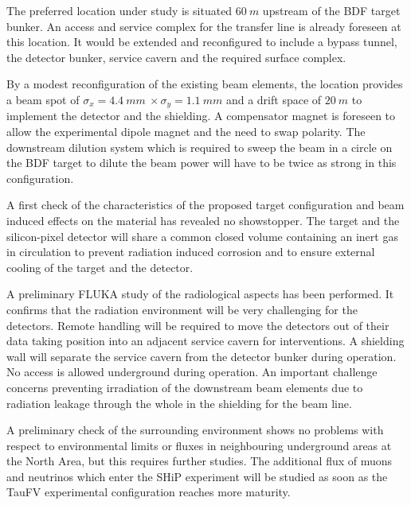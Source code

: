 The preferred location under study is situated $60~m$ upstream of the BDF target bunker. An 
access and service complex for the transfer line is already foreseen at this location. It would 
be extended and reconfigured to include a bypass tunnel, the detector bunker, service cavern 
and the required surface complex. 

By a modest reconfiguration of the existing beam elements, the location provides a beam spot of 
$\sigma_x=4.4~mm ~\times \sigma_y=1.1~mm$ and a drift space of $20~m$ to implement the detector 
and the shielding. A compensator magnet is foreseen to allow the experimental dipole magnet and 
the need to swap polarity. The downstream dilution system which is required to sweep the beam 
in a circle on the BDF target to dilute the beam power will have to be twice as strong in this 
configuration.

A first check of the characteristics of the proposed target configuration and beam induced 
effects on the material has revealed no showstopper. The target and the silicon-pixel detector 
will share a common closed volume containing an inert gas in circulation to prevent radiation 
induced corrosion and to ensure external cooling of the target and the detector.

A preliminary FLUKA study of the radiological aspects has been performed. It confirms that the 
radiation environment will be very challenging for the detectors. Remote handling will be 
required to move the detectors out of their data taking position into an adjacent service cavern 
for interventions. A shielding wall will separate the service cavern from the detector bunker 
during operation. No access is allowed underground during operation. An important challenge 
concerns preventing irradiation of the downstream beam elements due to radiation leakage through 
the whole in the shielding for the beam line.

A preliminary check of the surrounding environment shows no problems with respect to 
environmental limits or fluxes in neighbouring underground areas at the North Area, but this 
requires further studies. The additional flux of muons and neutrinos which enter the SHiP 
experiment will be studied as soon as the TauFV experimental configuration reaches more maturity.







